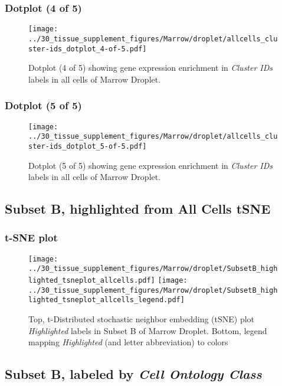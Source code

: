\clearpage

\subsubsection{Dotplot (4 of 5)}
\begin{figure}[h]
\centering
\texttt{[image: ../30\_tissue\_supplement\_figures/Marrow/droplet/allcells\_cluster-ids\_dotplot\_4-of-5.pdf]}

\caption{ Dotplot (4 of 5)  showing gene expression enrichment in \emph{Cluster IDs} labels in all cells of Marrow Droplet. }
\end{figure}


\clearpage

\subsubsection{Dotplot (5 of 5)}
\begin{figure}[h]
\centering
\texttt{[image: ../30\_tissue\_supplement\_figures/Marrow/droplet/allcells\_cluster-ids\_dotplot\_5-of-5.pdf]}

\caption{ Dotplot (5 of 5)  showing gene expression enrichment in \emph{Cluster IDs} labels in all cells of Marrow Droplet. }
\end{figure}


\clearpage
\subsection{Subset B, highlighted from All Cells tSNE}
\subsubsection{t-SNE plot}
\begin{figure}[h]
\centering
\texttt{[image: ../30\_tissue\_supplement\_figures/Marrow/droplet/SubsetB\_highlighted\_tsneplot\_allcells.pdf]}
\texttt{[image: ../30\_tissue\_supplement\_figures/Marrow/droplet/SubsetB\_highlighted\_tsneplot\_allcells\_legend.pdf]}
\caption{Top, t-Distributed stochastic neighbor embedding (tSNE) plot  \emph{Highlighted} labels in Subset B of Marrow Droplet. Bottom, legend mapping \emph{Highlighted} (and letter abbreviation) to colors}
\end{figure}


\clearpage

\subsection{Subset B, labeled by \emph{Cell Ontology Class}}
